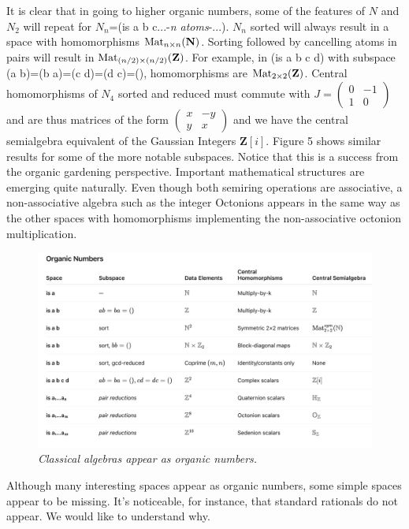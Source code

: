 \documentclass[11pt]{article}
\begin{document}
     It is clear that in going to higher organic numbers, some of the features of $N$ and $N_2$ will repeat for 
 $N_n$=(is a b c...-{\it n atoms}-...).  $N_n$ sorted 
 will always result in a space with homomorphisms ${\rm Mat}_{n\times n}(\mathbf N)$.  Sorting followed by cancelling 
 atoms in pairs will result in ${\rm Mat}_{(n/2)\times (n/2)}(\mathbf Z)$.  For example, in (is a b c d) with subspace 
 (a b)=(b a)=(c d)=(d c)=(), homomorphisms are ${\rm Mat}_{2\times 2}(\mathbf Z)$.  Central homomorphisms of $N_4$ sorted and reduced 
 must commute with 
 $
J=
\left (
\begin{array}{cc} 
0 & -1 \\ 1 & 0 
\end{array}
\right ) 
$
and are thus matrices of the form 
$
\left (
\begin{array}{cc} 
x & -y \\ y & x 
\end{array}
\right ) 
$
and we have the central semialgebra equivalent of the Gaussian Integers ${\mathbf Z}[i]$.  
Figure 5 shows similar results for some of the more notable subspaces.  
Notice that this is a success from the organic gardening perspective.  Important mathematical 
structures are emerging quite naturally.  Even though both semiring operations 
are associative, a non-associative algebra such as the integer Octonions appears in the 
same way as the other spaces with homomorphisms implementing the non-associative octonion 
multiplication\cite{octonions}.  
 
\begin{figure}[h]
\centering
\includegraphics[width=1.1\textwidth]{OrganicTable.png}
\caption{{\it Classical algebras appear as organic numbers.}}
\end{figure}
\noindent Although many interesting spaces appear as organic numbers, some simple spaces appear to be missing.  It's noticeable, 
for instance, that standard rationals do not appear.  We would like to understand why.  
\end{document}
